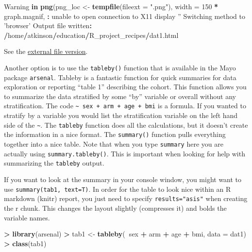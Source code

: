 \documentclass[
]{book}
\newenvironment{Shaded}{\begin{snugshade}}{\end{snugshade}}
\newcommand{\ControlFlowTok}[1]{\textcolor[rgb]{0.13,0.29,0.53}{\textbf{#1}}}
\newcommand{\DataTypeTok}[1]{\textcolor[rgb]{0.13,0.29,0.53}{#1}}
\newcommand{\DecValTok}[1]{\textcolor[rgb]{0.00,0.00,0.81}{#1}}
\newcommand{\ErrorTok}[1]{\textcolor[rgb]{0.64,0.00,0.00}{\textbf{#1}}}
\newcommand{\KeywordTok}[1]{\textcolor[rgb]{0.13,0.29,0.53}{\textbf{#1}}}
\newcommand{\NormalTok}[1]{#1}
\newcommand{\OperatorTok}[1]{\textcolor[rgb]{0.81,0.36,0.00}{\textbf{#1}}}
\newcommand{\StringTok}[1]{\textcolor[rgb]{0.31,0.60,0.02}{#1}}
\begin{document}
\begin{Shaded}
\begin{Highlighting}[]
\NormalTok{Warning }\ControlFlowTok{in} \KeywordTok{png}\NormalTok{(png_loc <-}\StringTok{ }\KeywordTok{tempfile}\NormalTok{(}\DataTypeTok{fileext =} \StringTok{".png"}\NormalTok{), }\DataTypeTok{width =} \DecValTok{150} \OperatorTok{*}
\NormalTok{graph.magnif, }\OperatorTok{:}\StringTok{ }\NormalTok{unable to open connection to X11 display }\StringTok{''}
\NormalTok{Switching method to }\StringTok{'browser'}
\NormalTok{Output file written}\OperatorTok{:}\StringTok{ }\ErrorTok{/}\NormalTok{home}\OperatorTok{/}\NormalTok{atkinson}\OperatorTok{/}\NormalTok{education}\OperatorTok{/}\NormalTok{R_project_recipes}\OperatorTok{/}\NormalTok{dat1.html}
\end{Highlighting}
\end{Shaded}

See the \href{dat1.html}{external file version}.

Another option is to use the \texttt{tableby()} function that is available in the Mayo package \texttt{arsenal}. Tableby is a fantastic function for quick summaries for data exploration or reporting ``table 1'' describing the cohort. This function allows you to summarize the data stratified by some ``by'' variable or overall without any stratification. The code \texttt{\textasciitilde{}\ sex\ +\ arm\ +\ age\ +\ bmi} is a formula. If you wanted to stratify by a variable you would list the stratification variable on the left hand side of the \texttt{\textasciitilde{}}. The \texttt{tableby} function does all the calculations, but it doesn't create the information in a nice format. The \texttt{summary()} function pulls everything together into a nice table. Note that when you type \texttt{summary} here you are actually using \texttt{summary.tableby()}. This is important when looking for help with summarizing the \texttt{tableby} output.

If you want to look at the summary in your console window, you might want to use \texttt{summary(tab1,\ text=T)}. In order for the table to look nice within an R markdown (knitr) report, you just need to specify
\texttt{results="asis"} when creating the r chunk. This changes the layout slightly (compresses it) and bolds the variable names.

\begin{Shaded}
\begin{Highlighting}[]
\OperatorTok{>}\StringTok{ }\KeywordTok{library}\NormalTok{(arsenal)}
\OperatorTok{>}\StringTok{ }\NormalTok{tab1 <-}\StringTok{ }\KeywordTok{tableby}\NormalTok{(}\OperatorTok{~}\NormalTok{sex }\OperatorTok{+}\StringTok{ }\NormalTok{arm }\OperatorTok{+}\StringTok{ }\NormalTok{age }\OperatorTok{+}\StringTok{ }\NormalTok{bmi, }\DataTypeTok{data =}\NormalTok{ dat1)}
\OperatorTok{>}\StringTok{ }\KeywordTok{class}\NormalTok{(tab1)}
\end{Highlighting}
\end{Shaded}
\end{document}
